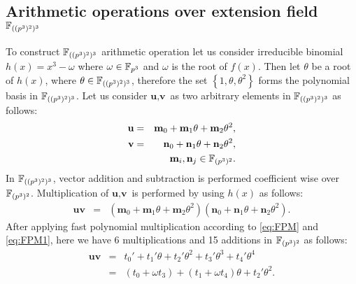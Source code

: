 \subsection{Arithmetic operations over extension field $\mathbb{F}_{((p^3)^2)^3}$}
To construct $\mathbb{F}_{((p^3)^2)^3}$ arithmetic operation let us consider irreducible binomial $h(x)=x^3-\omega$ where $\omega \in {\mathbb{F}}_{p^{3}}$ and $\omega$ is the root of $f(x)$. Then let $\theta$ be a root of $h(x)$, where $\theta \in \mathbb{F}_{((p^3)^2)^3}$, therefore the set $\left\lbrace 1, \theta, \theta^2 \right\rbrace$ forms the polynomial basis in $\mathbb{F}_{((p^3)^2)^3}$. Let us consider $\textbf{u},\textbf{v}$ as two arbitrary elements in $\mathbb{F}_{((p^3)^2)^3}$ as follows:
\begin{eqnarray}\label{eq:vec_uv_Fp_3_2_3}
\textbf{u} & = & \textbf{m}_0 + \textbf{m}_1\theta + \textbf{m}_2\theta^2,  \nonumber \\ 
\textbf{v} & = & \textbf{n}_0 + \textbf{n}_1\theta+ \textbf{n}_2\theta^2,  \nonumber \\
& &  \textbf{m}_i,  \textbf{n}_j \in  \mathbb{F}_{(p^3)^2}. \nonumber
\end{eqnarray} 
In  $\mathbb{F}_{((p^3)^2)^3}$, vector addition and subtraction is performed coefficient wise over  $\mathbb{F}_{(p^3)^2}$. 
Multiplication of  $\textbf{u},\textbf{v}$ is performed by using $h(x)$ as follows:
\begin{eqnarray}\label{eq:mul_fq_3_2_3}
\textbf{uv} & = & (\textbf{m}_0 + \textbf{m}_1\theta + \textbf{m}_2\theta^2)( \textbf{n}_0 + \textbf{n}_1\theta+ \textbf{n}_2\theta^2).
\end{eqnarray}
 After applying fast polynomial multiplication according to \eqref{eq:FPM} and \eqref{eq:FPM1}, here we have 6 multiplications and 15 additions in $\mathbb{F}_{(p^3)^2}$ as follows:
\begin{eqnarray}\label{mul_3_2_3}
\textbf{uv} & = & t_0' + t_1'\theta + t_2'\theta^2 + t_3' \theta^3 + t_4'\theta^4 \nonumber \\
& = & (t_0 + \omega t_3 ) + (t_1+\omega t_4)\theta + t_2'\theta^2.
\end{eqnarray}

